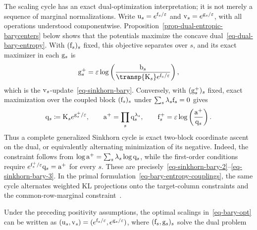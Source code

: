 The scaling cycle has an exact dual-optimization interpretation; it is not merely a sequence of marginal normalizations. Write
\(\mathrm{u}_s=e^{\mathrm{f}_s/\varepsilon}\) and \(\mathrm{v}_s=e^{\mathrm{g}_s/\varepsilon}\), with all operations understood componentwise. Proposition~\ref{prop-dual-entropic-barycenters} below shows that the potentials maximize the concave dual~\eqref{eq-dual-bary-entropy}. With $(\mathrm{f}_s)_s$ fixed, this objective separates over $s$, and its exact maximizer in each $\mathrm{g}_s$ is
\[
	\gD_s^+
	=
	\epsilon\log\pa{\frac{\b_s}{\transp{\K_s}e^{\fD_s/\epsilon}}},
\]
which is the $\mathrm{v}_s$-update~\eqref{eq-sinkhorn-bary}. Conversely, with $(\mathrm{g}_s^+)_s$ fixed, exact maximization over the coupled block $(\mathrm{f}_s)_s$ under $\sum_s\lambda_s\mathrm{f}_s=0$ gives
\[
	\mathrm{q}_s
	\coloneqq
	\mathrm{K}_s e^{\mathrm{g}_s^+/\varepsilon},
	\qquad
	\mathrm{a}^+
	=
	\prod_s\mathrm{q}_s^{\lambda_s},
	\qquad
	\mathrm{f}_s^+
	=
	\varepsilon\log\left( \frac{\mathrm{a}^+}{\mathrm{q}_s} \right).
\]
Thus a complete generalized Sinkhorn cycle is exact two-block coordinate ascent on the dual, or equivalently alternating minimization of its negative. Indeed, the constraint follows from $\log\mathrm{a}^+=\sum_s\lambda_s\log\mathrm{q}_s$, while the first-order conditions require $e^{\mathrm{f}_s^+/\varepsilon}\mathrm{q}_s=\mathrm{a}^+$ for every $s$. These are precisely~\eqref{eq-sinkhorn-bary-2}--\eqref{eq-sinkhorn-bary-3}. In the primal formulation~\eqref{eq-bary-entropy-couplings}, the same cycle alternates weighted KL projections onto the target-column constraints and the common-row-marginal constraint~\cite{2015-benamou-cisc}.

\begin{prop}\label{prop-dual-entropic-barycenters}
	Under the preceding positivity assumptions, the optimal scalings in~\eqref{eq-bary-opt} can be written as $(\mathrm{u}_s,\mathrm{v}_s)=(e^{\mathrm{f}_s/\varepsilon},e^{\mathrm{g}_s/\varepsilon})$, where $(\mathrm{f}_s,\mathrm{g}_s)_s$ solve the dual problem
\end{prop}

